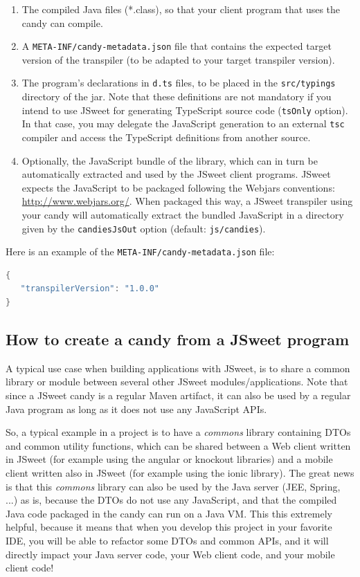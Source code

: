 \documentclass[a4paper]{report}
\begin{document}
\begin{enumerate}
\item The compiled Java files (*.class), so that your client program that uses the candy can compile.
\item A \texttt{META-INF/candy-metadata.json} file that contains the expected target version of the transpiler (to be adapted to your target transpiler version).
\item The program's declarations in \texttt{d.ts} files, to be placed in the \texttt{src/typings} directory of the jar. Note that these definitions are not mandatory if you intend to use JSweet for generating TypeScript source code (\texttt{tsOnly} option). In that case, you may delegate the JavaScript generation to an external \texttt{tsc} compiler and access the TypeScript definitions from another source.
\item Optionally, the JavaScript bundle of the library, which can in turn be automatically extracted and used by the JSweet client programs. JSweet expects the JavaScript to be packaged following the Webjars conventions: \url{http://www.webjars.org/}. When packaged this way, a JSweet transpiler using your candy will automatically extract the bundled JavaScript in a directory given by the \texttt{candiesJsOut} option (default: \texttt{js/candies}).
\end{enumerate}

Here is an example of the \texttt{META-INF/candy-metadata.json} file:

\begin{lstlisting}[language=Java]
{
   "transpilerVersion": "1.0.0"
}
\end{lstlisting}

\subsection{How to create a candy from a JSweet program}

A typical use case when building applications with JSweet, is to share a common library or module between several other JSweet modules/applications. Note that since a JSweet candy is a regular Maven artifact, it can also be used by a regular Java program as long as it does not use any JavaScript APIs. 

So, a typical example in a project is to have a \emph{commons} library containing DTOs and common utility functions, which can be shared between a Web client written in JSweet (for example using the angular or knockout libraries) and a mobile client written also in JSweet (for example using the ionic library). The great news is that this \emph{commons} library can also be used by the Java server (JEE, Spring, ...) as is, because the DTOs do not use any JavaScript, and that the compiled Java code packaged in the candy can run on a Java VM. This this extremely helpful, because it means that when you develop this project in your favorite IDE, you will be able to refactor some DTOs and common APIs, and it will directly impact your Java server code, your Web client code, and your mobile client code!
\end{document}
